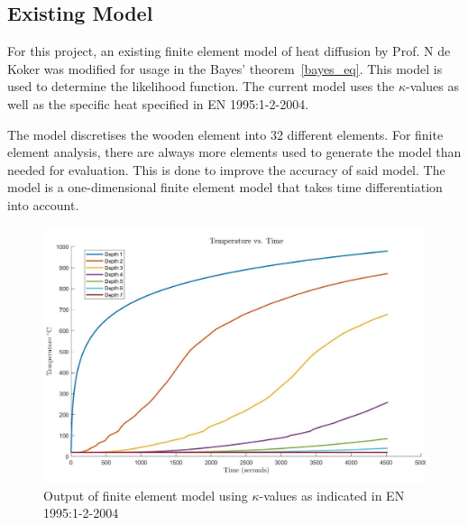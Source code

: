 \subsection{Existing Model}
	For this project, an existing finite element model of heat diffusion by Prof. N de Koker was modified for usage in the Bayes' theorem~\ref{bayes_eq}. 
	This model is used to determine the likelihood function. 
	The current model uses the $\kappa$-values as well as the specific heat specified in EN 1995:1-2-2004. 
	
	The model discretises the wooden element into 32 different elements. For finite element analysis, there are always more elements used to generate the model than needed for evaluation. This is done to improve the accuracy of said model.
	The model is a one-dimensional finite element model that takes time differentiation into account.
	
\begin{figure}[H]
	\label{og_modeldata}
	\centering
	\includegraphics[width=\textwidth,]{figures/originalmugraph.jpg}
	\caption{Output of finite element model using $\kappa$-values as indicated in EN 1995:1-2-2004}
\end{figure}	

